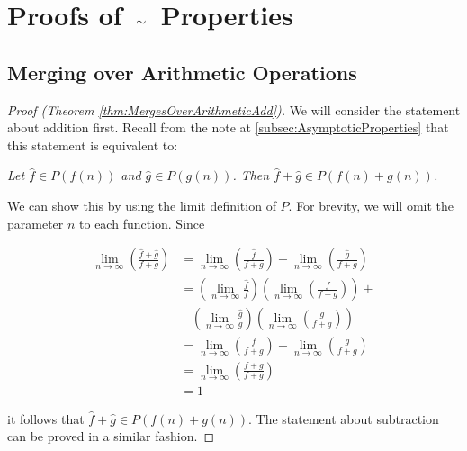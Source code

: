 \appendix
\appendixpage

\section{Proofs of $\ \mathtt{\sim}\ $ Properties}

\subsection{Merging over Arithmetic Operations}
\label{pf:MergesOverArithmetic}

\begin{proof}[Proof (Theorem \ref{thm:MergesOverArithmeticAdd})]
	We will consider the statement about addition first. Recall from the note at \ref{subsec:AsymptoticProperties} that this statement is equivalent to:
	
	\textit{Let $\hat{f} \in P(f(n))$ and $\hat{g} \in P(g(n))$. Then $\hat{f} + \hat{g} \in P(f(n) + g(n))$.}
	
	We can show this by using the limit definition of $P$. For brevity, we will omit the parameter $n$ to each function. Since
	
	\begin{align*}
	\lim_{n \to \infty} \left( \frac{\hat{f} + \hat{g}}{f + g} \right) &= \lim_{n \to \infty} \left( \frac{\hat{f}}{f + g} \right) + \lim_{n \to \infty} \left( \frac{\hat{g}}{f + g} \right)\\
	&= \left( \lim_{n \to \infty} \frac{\hat{f}}{f} \right) \left( \lim_{n \to \infty} \left( \frac{f}{f + g} \right) \right) +\\
	&\ \ \ \ \left( \lim_{n \to \infty} \frac{\hat{g}}{g} \right) \left( \lim_{n \to \infty} \left( \frac{g}{f + g} \right) \right)\\
	&= \lim_{n \to \infty} \left( \frac{f}{f + g} \right) + \lim_{n \to \infty} \left( \frac{g}{f + g} \right)\\
	&= \lim_{n \to \infty} \left( \frac{f + g}{f + g} \right)\\
	&= 1
	\end{align*}
	
	it follows that $\hat{f} + \hat{g} \in P(f(n) + g(n))$. The statement about subtraction can be proved in a similar fashion.
\end{proof}

